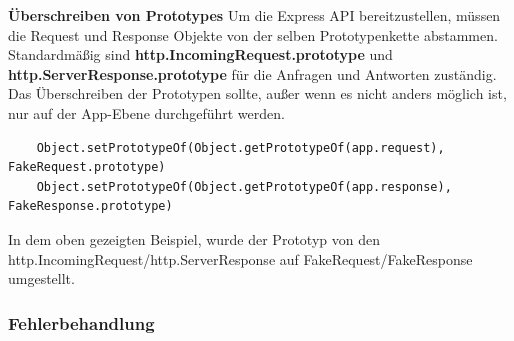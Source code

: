 \textbf{Überschreiben von Prototypes}
\newline
Um die Express API bereitzustellen, müssen die Request und Response Objekte von der selben Prototypenkette abstammen. Standardmäßig sind \textbf{http.IncomingRequest.prototype} und \textbf{http.ServerResponse.prototype} für die Anfragen und Antworten zuständig. Das Überschreiben der Prototypen sollte, außer wenn es nicht anders möglich ist, nur auf der App-Ebene durchgeführt werden.
\begin{lstlisting}
    Object.setPrototypeOf(Object.getPrototypeOf(app.request), FakeRequest.prototype)
    Object.setPrototypeOf(Object.getPrototypeOf(app.response), FakeResponse.prototype)
\end{lstlisting}
In dem oben gezeigten Beispiel, wurde der Prototyp von den http.IncomingRequest/http.ServerResponse auf FakeRequest/FakeResponse umgestellt.
\cite{Express_js_overriding_api}

\subsubsection{Fehlerbehandlung}
